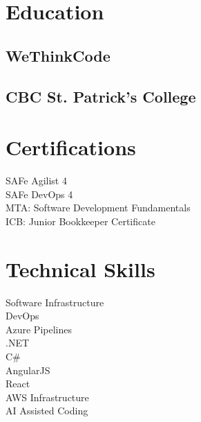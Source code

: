 \documentclass[]{deedy-resume-openfont}
\begin{document}
%
%
\lastupdated

%
%

%
%

\begin{minipage}[t]{0.33\textwidth} 


\section{Education} 

\subsection{WeThinkCode}
\sectionsep

\subsection{CBC St. Patrick's College}
\sectionsep

\section{Certifications}
SAFe Agilist 4 \\
SAFe DevOps 4 \\
MTA: Software Development Fundamentals \\
ICB: Junior Bookkeeper Certificate \\
\sectionsep


\section{Technical Skills}
Software Infrastructure \\
DevOps \\
Azure Pipelines \\
.NET \\
C\# \\
AngularJS \\
React \\
AWS Infrastructure \\
AI Assisted Coding \\
\sectionsep


\end{minipage}
\end{document}
